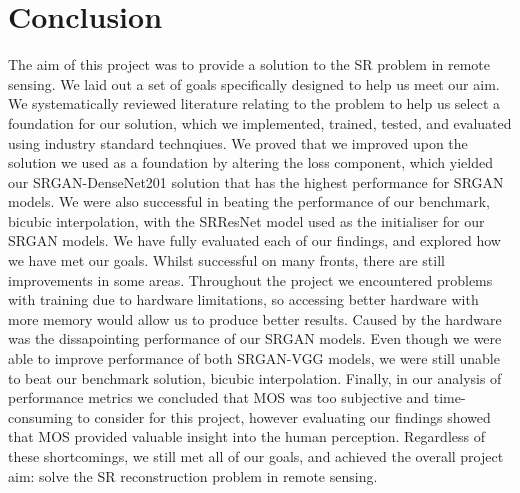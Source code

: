 \section{Conclusion}
The aim of this project was to provide a solution to the SR problem in remote sensing. We laid out a set of goals specifically designed to help us meet our aim. We systematically reviewed literature relating to the problem to help us select a foundation for our solution, which we implemented, trained, tested, and evaluated using industry standard technqiues. We proved that we improved upon the solution we used as a foundation by altering the loss component, which yielded our SRGAN-DenseNet201 solution that has the highest performance for SRGAN models. We were also successful in beating the performance of our benchmark, bicubic interpolation, with the SRResNet model used as the initialiser for our SRGAN models. We have fully evaluated each of our findings, and explored how we have met our goals. Whilst successful on many fronts, there are still improvements in some areas. Throughout the project we encountered problems with training due to hardware limitations, so accessing better hardware with more memory would allow us to produce better results. Caused by the hardware was the dissapointing performance of our SRGAN models. Even though we were able to improve performance of both SRGAN-VGG models, we were still unable to beat our benchmark solution, bicubic interpolation. Finally, in our analysis of performance metrics we concluded that MOS was too subjective and time-consuming to consider for this project, however evaluating our findings showed that MOS provided valuable insight into the human perception. Regardless of these shortcomings, we still met all of our goals, and achieved the overall project aim: solve the SR reconstruction problem in remote sensing.

